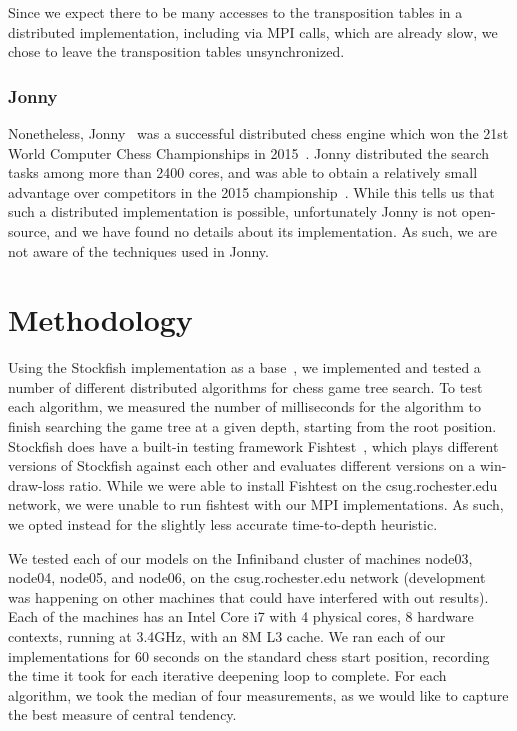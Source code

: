 \documentclass{article}
\begin{document}
Since we expect there to be many accesses to the transposition tables in a
distributed implementation, including via MPI calls, which are already slow, we
chose to leave the transposition tables unsynchronized.

\subsubsection{Jonny}
Nonetheless, Jonny~\cite{wiki:Jonny} was a successful distributed chess engine
which won the 21st World Computer Chess Championships in 2015~\cite{WCCC15}.
Jonny distributed the search tasks among more than 2400 cores, and was able to
obtain a relatively small advantage over competitors in the 2015
championship~\cite{WCCC15}.
While this tells us that such a distributed implementation is possible,
unfortunately Jonny is not open-source, and we have found no details about its
implementation. As such, we are not aware of the techniques used in Jonny.

\section{Methodology}\label{Algorithms}
Using the Stockfish implementation as a base~\cite{stockfish:code},
we implemented and tested a number
of different distributed algorithms for chess game tree search. To test each
algorithm, we measured the number of milliseconds for the algorithm to finish
searching the game tree at a given depth, starting from the root position.
Stockfish does have a built-in testing framework Fishtest~\cite{fishtest:code},
which plays different versions of Stockfish against each other and evaluates
different versions on a win-draw-loss ratio. While we were able to install Fishtest 
on the csug.rochester.edu network, we were unable to run fishtest with our MPI
implementations. As such, we opted instead for the 
slightly less accurate time-to-depth heuristic.

We tested each of our models on the Infiniband cluster of machines
node03, node04, node05, and node06, on the csug.rochester.edu network
(development was happening on other machines that could have interfered with
out results).
Each of the machines has an Intel Core i7 with 4 physical cores, 8 hardware contexts, running at 3.4GHz, with
an 8M L3 cache. We ran each of our implementations for 60
seconds on the standard chess start position, recording the time it took for each iterative
deepening loop to complete. For each algorithm, we took the median of four
measurements, as we would like to capture the best measure of central tendency.
\end{document}
